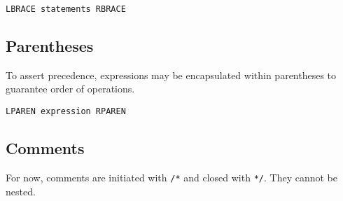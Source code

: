 			\begin{lstlisting}
LBRACE statements RBRACE
			\end{lstlisting}
			
		\subsection{Parentheses}
			To assert precedence, expressions may be encapsulated within parentheses to guarantee order of operations. 
			
			\begin{lstlisting}
LPAREN expression RPAREN
			\end{lstlisting}
			
		\subsection{Comments}
			For now, comments are initiated with \texttt{/*} and closed with \texttt{*/}. They cannot be nested.
